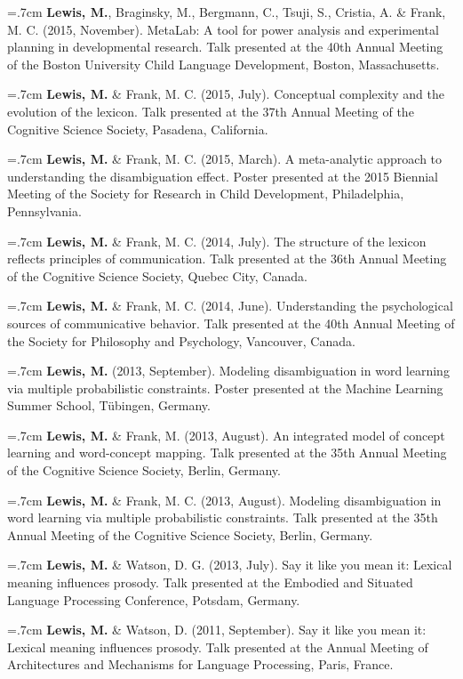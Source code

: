 \documentclass[letterpaper]{article}
\begin{document}
\hangindent=.7cm {\bf Lewis, M.},  Braginsky,  M.,  Bergmann, C., Tsuji, S., Cristia, A. \& Frank, M. C. (2015, November). MetaLab: A tool for power analysis and experimental planning in developmental research. Talk presented at the 40th Annual Meeting of the Boston University Child Language Development, Boston, Massachusetts.

\hangindent=.7cm {\bf Lewis, M.} \& Frank, M. C. (2015, July). Conceptual complexity and the evolution of the lexicon. Talk presented at the 37th Annual Meeting of the Cognitive Science Society, Pasadena, California.

\hangindent=.7cm {\bf Lewis, M.} \& Frank, M. C. (2015, March). A meta-analytic approach to understanding the disambiguation effect. Poster presented at  the 2015 Biennial Meeting of the Society for Research in Child Development, Philadelphia, Pennsylvania.


\hangindent=.7cm {\bf Lewis, M.} \& Frank, M. C. (2014, July). The structure of the lexicon reflects  principles of communication. Talk presented at the 36th Annual Meeting of the Cognitive Science Society, Quebec City, Canada.

\hangindent=.7cm {\bf Lewis, M.} \& Frank, M. C. (2014, June). Understanding the psychological sources of communicative behavior. Talk presented at the 40th Annual Meeting of the Society for Philosophy and Psychology, Vancouver, Canada.

 \hangindent=.7cm {\bf Lewis, M.} (2013, September). Modeling disambiguation in word learning via multiple probabilistic constraints. Poster presented at the Machine Learning Summer School, T\"{u}bingen, Germany.
 

 \hangindent=.7cm {\bf Lewis, M.}  \& Frank, M. (2013, August). An integrated model of concept learning and word-concept mapping. Talk presented at the 35th Annual Meeting of the Cognitive Science Society, Berlin, Germany.
 
 \hangindent=.7cm {\bf Lewis, M.}  \& Frank, M. C.  (2013, August). Modeling disambiguation in word learning via multiple probabilistic constraints. Talk presented at the 35th Annual Meeting of the Cognitive Science Society, Berlin, Germany.
 
  \hangindent=.7cm {\bf Lewis, M.} \& Watson, D. G.  (2013, July). Say it like you mean it: Lexical meaning influences prosody. Talk presented at the Embodied and Situated Language Processing Conference, Potsdam, Germany.
 

 \hangindent=.7cm {\bf Lewis, M.}  \& Watson, D. (2011, September). Say it like you mean it: Lexical meaning influences prosody. Talk presented at the Annual Meeting of Architectures and Mechanisms for Language Processing, Paris, France.
 
\end{document}
